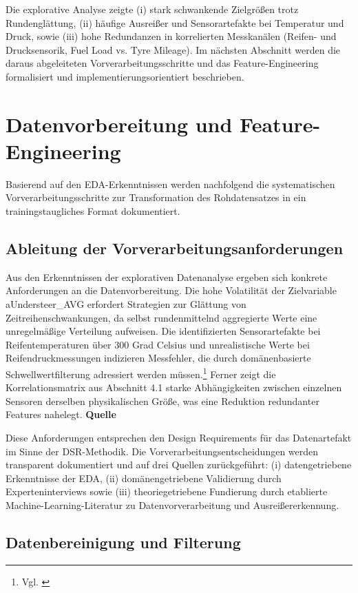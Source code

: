 Die explorative Analyse zeigte (i) stark schwankende Zielgrößen trotz Rundenglättung, (ii) häufige Ausreißer und Sensorartefakte bei Temperatur und Druck, sowie (iii) hohe Redundanzen in korrelierten Messkanälen (Reifen- und Drucksensorik, Fuel Load vs. Tyre Mileage). Im nächsten Abschnitt werden die daraus abgeleiteten Vorverarbeitungsschritte und das Feature-Engineering formalisiert und implementierungsorientiert beschrieben.



\section{Datenvorbereitung und Feature-Engineering}

Basierend auf den EDA-Erkenntnissen werden nachfolgend die systematischen Vorverarbeitungsschritte zur Transformation des Rohdatensatzes in ein trainingstaugliches Format dokumentiert.

\subsection{Ableitung der Vorverarbeitungsanforderungen}

Aus den Erkenntnissen der explorativen Datenanalyse ergeben sich konkrete Anforderungen an die Datenvorbereitung. Die hohe Volatilität der Zielvariable aUndersteer\_AVG erfordert Strategien zur Glättung von Zeitreihenschwankungen, da selbst rundenmittelnd aggregierte Werte eine unregelmäßige Verteilung aufweisen. Die identifizierten Sensorartefakte bei Reifentemperaturen über 300 Grad Celsius und unrealistische Werte bei Reifendruckmessungen indizieren Messfehler, die durch domänenbasierte Schwellwertfilterung adressiert werden müssen.\footnote{Vgl. \cite{Experteninterview1}} Ferner zeigt die Korrelationsmatrix aus Abschnitt 4.1 starke Abhängigkeiten zwischen einzelnen Sensoren derselben physikalischen Größe, was eine Reduktion redundanter Features nahelegt. \textbf{Quelle} 

Diese Anforderungen entsprechen den Design Requirements für das Datenartefakt im Sinne der DSR-Methodik. Die Vorverarbeitungsentscheidungen werden transparent dokumentiert und auf drei Quellen zurückgeführt: (i) datengetriebene Erkenntnisse der EDA, (ii) domänengetriebene Validierung durch Experteninterviews sowie (iii) theoriegetriebene Fundierung durch etablierte Machine-Learning-Literatur zu Datenvorverarbeitung und Ausreißererkennung.


\subsection{Datenbereinigung und Filterung}

